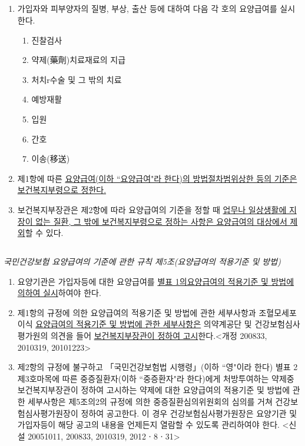 \subsection{}
\begin{enumerate}[①]\tightlist
\item 가입자와 피부양자의 질병, 부상, 출산 등에 대하여 다음 각 호의 요양급여를 실시한다.
	\begin{enumerate}[	1.]\tightlist
	\item 진찰\cntrdot{}검사
	\item 약제(藥劑)\cntrdot{}치료재료의 지급
	\item 처치r수술 및 그 밖의 치료
	\item 예방\cntrdot{}재활
	\item 입원
	\item 간호
	\item 이송(移送)
	\end{enumerate}
\item 제1항에 따른 \uline{요양급여(이하 ``요양급여"라 한다)의 방법\cntrdot{}절차\cntrdot{}범위\cntrdot{}상한 등의 기준은 보건복지부령으로 정한다.}
\item 보건복지부장관은 제2항에 따라 요양급여의 기준을 정할 때 \uline{업무나 일상생활에 지장이 없는 질환, 그 밖에 보건복지부령으로 정하는 사항은 요양급여의 대상에서 제외}할 수 있다.
\end{enumerate}

\subsection{}
\emph{국민건강보험 요양급여의 기준에 관한 규칙  제5조(요양급여의 적용기준 및 방법)}
\begin{enumerate}[①]\tightlist
\item 요양기관은 가입자등에 대한 요양급여를 \uline{별표 1의요양급여의 적용기준 및 방법에 의하여 실시}하여야 한다.
\item 제1항의 규정에 의한 요양급여의 적용기준 및 방법에 관한 세부사항과 조혈모세포이식 \uline{요양급여의 적용기준 및 방법에 관한 세부사항은} 의약계\cntrdot{}공단 및 건강보험심사평가원의 의견을 들어 \uline{보건복지부장관이 정하여 고시}한다.<개정 2008\cntrdot{}3\cntrdot{}3, 2010\cntrdot{}3\cntrdot{}19, 2010\cntrdot{}12\cntrdot{}23>
\item 제2항의 규정에 불구하고 「국민건강보험법 시행령」(이하 ``영"이라 한다) 별표 2 제3호마목에 따른 중증질환자(이하 ``중증환자"라 한다)에게 처방\cntrdot{}투여하는 약제중 보건복지부장관이 정하여 고시하는 약제에 대한 요양급여의 적용기준 및 방법에 관한 세부사항은 제5조의2의 규정에 의한 중증질환심의위원회의 심의를 거쳐 건강보험심사평가원장이 정하여 공고한다. 이 경우 건강보험심사평가원장은 요양기관 및 가입자등이 해당 공고의 내용을 언제든지 열람할 수 있도록 관리하여야 한다. <신설 2005\cntrdot{}10\cntrdot{}11, 2008\cntrdot{}3\cntrdot{}3, 2010\cntrdot{}3\cntrdot{}19, 2012ㆍ8ㆍ31>
\end{enumerate}

